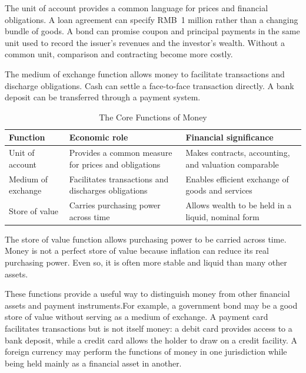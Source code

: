 The unit of account provides a common language for prices and financial obligations. A loan agreement can specify RMB~1 million rather than a changing bundle of goods. A bond can promise coupon and principal payments in the same unit used to record the issuer's revenues and the investor's wealth. Without a common unit, comparison and contracting become more costly.

The medium of exchange function allows money to facilitate transactions and discharge obligations. Cash can settle a face-to-face transaction directly. A bank deposit can be transferred through a payment system. 


\begin{table}[H]
\centering
\caption{The Core Functions of Money}
\label{tab:ch2-money-functions}
\renewcommand{\arraystretch}{1.4}
\begin{tabularx}{\textwidth}{
    @{}
    >{\raggedright\arraybackslash}p{3.0cm}
    >{\raggedright\arraybackslash}X
    >{\raggedright\arraybackslash}X
    @{}
}
\toprule
\textbf{Function}
& \textbf{Economic role}
& \textbf{Financial significance} \\
\midrule

Unit of account
& Provides a common measure for prices and obligations
& Makes contracts, accounting, and valuation comparable \\

Medium of exchange
& Facilitates transactions and discharges obligations
& Enables efficient exchange of goods and services \\

Store of value
& Carries purchasing power across time
& Allows wealth to be held in a liquid, nominal form \\

\bottomrule
\end{tabularx}
\end{table}

The store of value function allows purchasing power to be carried across time. Money is not a perfect store of value because inflation can reduce its real purchasing power. Even so, it is often more stable and liquid than many other assets. 

These functions provide a useful way to distinguish money from other financial assets and payment instruments.For example, a government bond may be a good store of value without serving as a medium of exchange. A payment card facilitates transactions but is not itself money: a debit card provides access to a bank deposit, while a credit card allows the holder to draw on a credit facility. A foreign currency may perform the functions of money in one jurisdiction while being held mainly as a financial asset in another.


